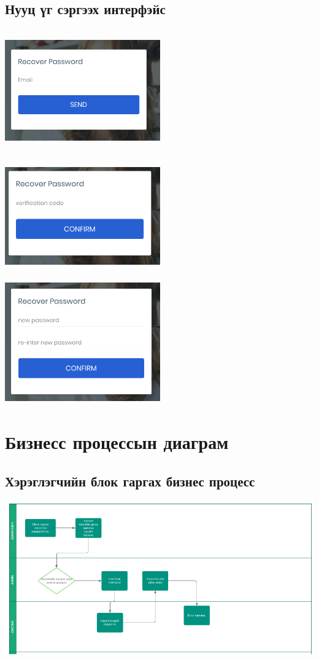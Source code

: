 \documentclass[
oneside, %
english, %
onehalfspacing, %
nolistspacing, %
headsepline, %
]{article} %
\begin{document}
     \subsection{ Нууц үг сэргээх интерфэйс}
     \includegraphics[width=190pt, height=150pt]{forget1}
     \includegraphics[width=190pt, height=150pt]{forget2}\newline \break
     \includegraphics[width=190pt, height=150pt]{forget3}
     
     \section{Бизнесс процессын диаграм}
     	\subsection{Хэрэглэгчийн блок гаргах бизнес процесс }
     \includegraphics[width=\textwidth]{BP}
     	
\end{document}
